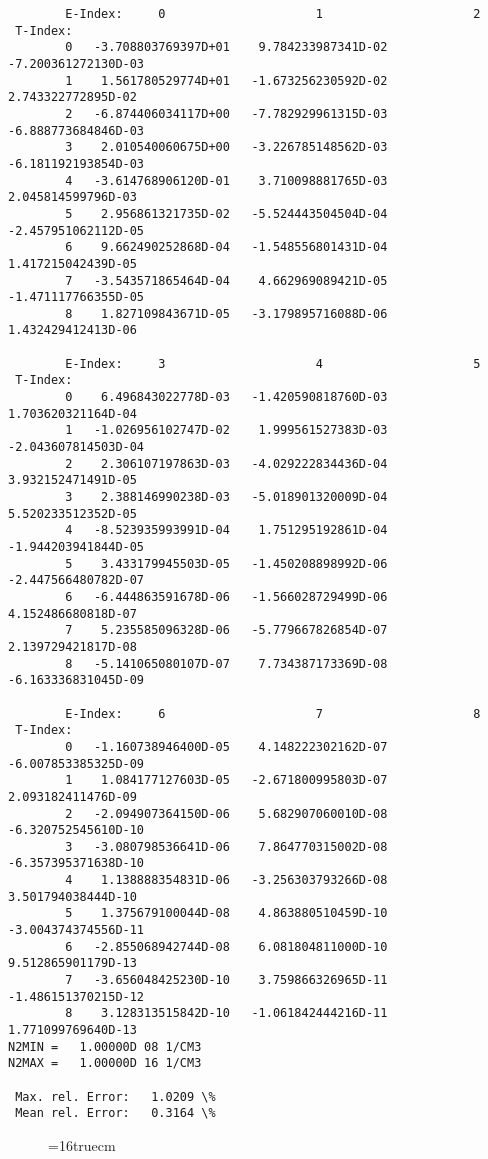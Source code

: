 \documentclass[12pt,dvipdfmx]{article}
\begin{document}
\begin{small}\begin{verbatim}
        E-Index:     0                     1                     2
 T-Index:
        0   -3.708803769397D+01    9.784233987341D-02   -7.200361272130D-03
        1    1.561780529774D+01   -1.673256230592D-02    2.743322772895D-02
        2   -6.874406034117D+00   -7.782929961315D-03   -6.888773684846D-03
        3    2.010540060675D+00   -3.226785148562D-03   -6.181192193854D-03
        4   -3.614768906120D-01    3.710098881765D-03    2.045814599796D-03
        5    2.956861321735D-02   -5.524443504504D-04   -2.457951062112D-05
        6    9.662490252868D-04   -1.548556801431D-04    1.417215042439D-05
        7   -3.543571865464D-04    4.662969089421D-05   -1.471117766355D-05
        8    1.827109843671D-05   -3.179895716088D-06    1.432429412413D-06

        E-Index:     3                     4                     5
 T-Index:
        0    6.496843022778D-03   -1.420590818760D-03    1.703620321164D-04
        1   -1.026956102747D-02    1.999561527383D-03   -2.043607814503D-04
        2    2.306107197863D-03   -4.029222834436D-04    3.932152471491D-05
        3    2.388146990238D-03   -5.018901320009D-04    5.520233512352D-05
        4   -8.523935993991D-04    1.751295192861D-04   -1.944203941844D-05
        5    3.433179945503D-05   -1.450208898992D-06   -2.447566480782D-07
        6   -6.444863591678D-06   -1.566028729499D-06    4.152486680818D-07
        7    5.235585096328D-06   -5.779667826854D-07    2.139729421817D-08
        8   -5.141065080107D-07    7.734387173369D-08   -6.163336831045D-09

        E-Index:     6                     7                     8
 T-Index:
        0   -1.160738946400D-05    4.148222302162D-07   -6.007853385325D-09
        1    1.084177127603D-05   -2.671800995803D-07    2.093182411476D-09
        2   -2.094907364150D-06    5.682907060010D-08   -6.320752545610D-10
        3   -3.080798536641D-06    7.864770315002D-08   -6.357395371638D-10
        4    1.138888354831D-06   -3.256303793266D-08    3.501794038444D-10
        5    1.375679100044D-08    4.863880510459D-10   -3.004374374556D-11
        6   -2.855068942744D-08    6.081804811000D-10    9.512865901179D-13
        7   -3.656048425230D-10    3.759866326965D-11   -1.486151370215D-12
        8    3.128313515842D-10   -1.061842444216D-11    1.771099769640D-13
N2MIN =   1.00000D 08 1/CM3
N2MAX =   1.00000D 16 1/CM3

 Max. rel. Error:   1.0209 \%
 Mean rel. Error:   0.3164 \%

\end{verbatim}\end{small}
\begin{figure} \label{2.2.11}
\epsfxsize=16truecm
\end{figure}
\newpage
\end{document}
